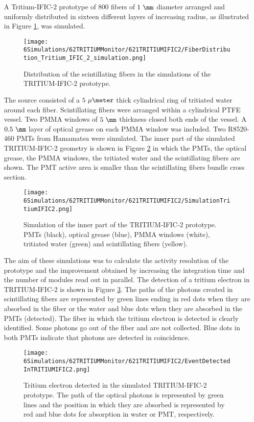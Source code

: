 A Tritium-IFIC-2 prototype of $800$ fibers of $1~\mm$ diameter arranged and uniformly distributed in sixteen different layers of increasing radius, as illustrated in Figure \ref{fig:FibersTritiumIFIC2Simulation}, was simulated.
\begin{figure}[h]
\centering
\texttt{[image: 6Simulations/62TRITIUMMonitor/621TRITIUMIFIC2/FiberDistribution\_Tritium\_IFIC\_2\_simulation.png]}
\caption{Distribution of the scintillating fibers in the simulations of the TRITIUM-IFIC-2 prototype.\label{fig:FibersTritiumIFIC2Simulation}}
\end{figure}
The source consisted of a $5~\mu\meter$ thick cylindrical ring of tritiated water around each fiber. Scintillating fibers were arranged within a cylindrical PTFE vessel. Two PMMA windows of $5~\mm$ thickness closed both ends of the vessel. A $0.5~\mm$ layer of optical grease on each PMMA window was included. Two R8520-460 PMTs from Hamamatsu \cite{DataSheetPMTs} were simulated. The inner part of the simulated TRITIUM-IFIC-2 geometry is shown in Figure \ref{fig:TritiumIFIC2Simulation} in which the PMTs, the optical grease, the PMMA windows, the tritiated water and the scintillating fibers are shown. The PMT active area is smaller than the scintillating fibers bundle cross section.
\begin{figure}[h]
\centering
\texttt{[image: 6Simulations/62TRITIUMMonitor/621TRITIUMIFIC2/SimulationTritiumIFIC2.png]}
\caption{Simulation of the inner part of the TRITIUM-IFIC-2 prototype. PMTs (black), optical grease (blue), PMMA windows (white), tritiated water (green) and scintillating fibers (yellow). \label{fig:TritiumIFIC2Simulation}}
\end{figure}
The aim of these simulations was to calculate the activity resolution of the prototype and the improvement obtained by increasing the integration time and the number of modules read out in parallel. The detection of a tritium electron in TRITIUM-IFIC-2 is shown in Figure \ref{fig:TritiumEventDetectedInSimulatedPrototype}. The paths of the photons created in scintillating fibers are represented by green lines ending in red dots when they are absorbed in the fiber or the water and blue dots when they are absorbed in the PMTs (detected). The fiber in which the tritium electron is detected is clearly identified. Some photons go out of the fiber and are not collected. Blue dots in both PMTs indicate that photons are detected in coincidence.
\begin{figure}[hbtp]
\centering
\texttt{[image: 6Simulations/62TRITIUMMonitor/621TRITIUMIFIC2/EventDetectedInTRITIUMIFIC2.png]}
\caption{Tritium electron detected in the simulated TRITIUM-IFIC-2 prototype. The path of the optical photons is represented by green lines and the position in which they are absorbed is represented by red and blue dots for absorption in water or PMT, respectively.\label{fig:TritiumEventDetectedInSimulatedPrototype}}
\end{figure}
